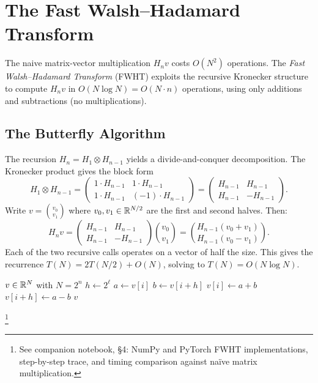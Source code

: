 \section{The Fast Walsh--Hadamard Transform}\label{sec:fwht}

The naive matrix-vector multiplication $H_n v$ costs $O(N^2)$ operations.
The \emph{Fast Walsh--Hadamard Transform} (FWHT)%
\citep{shanks1969computation} exploits the recursive Kronecker
structure to compute $H_n v$ in $O(N \log N) = O(N \cdot n)$
operations, using only additions and subtractions (no multiplications).

\subsection{The Butterfly Algorithm}\label{sec:butterfly}

The recursion $H_n = H_1 \otimes H_{n-1}$ yields a divide-and-conquer
decomposition. The Kronecker product gives the block form
\[
  H_1 \otimes H_{n-1}
  = \begin{pmatrix} 1 \cdot H_{n-1} & 1 \cdot H_{n-1} \\
                     1 \cdot H_{n-1} & (-1) \cdot H_{n-1} \end{pmatrix}
  = \begin{pmatrix} H_{n-1} & H_{n-1} \\ H_{n-1} & -H_{n-1} \end{pmatrix}.
\]
Write $v = \binom{v_0}{v_1}$ where $v_0, v_1 \in \mathbb{R}^{N/2}$
are the first and second halves. Then:
\[
  H_n v
  = \begin{pmatrix} H_{n-1} & H_{n-1} \\ H_{n-1} & -H_{n-1} \end{pmatrix}
    \binom{v_0}{v_1}
  = \binom{H_{n-1}(v_0 + v_1)}{H_{n-1}(v_0 - v_1)}.
\]
Each of the two recursive calls operates on a vector of half the size.
This gives the recurrence $T(N) = 2T(N/2) + O(N)$, solving to
$T(N) = O(N \log N)$.

\begin{algorithm}[H]
\caption{Fast Walsh--Hadamard Transform (in-place)}\label{alg:fwht}
\begin{algorithmic}[1]
\Require $v \in \mathbb{R}^N$ with $N = 2^n$
  \State $h \gets 2^\ell$ 
      \State $a \gets v[i]$
      \State $b \gets v[i + h]$
      \State $v[i] \gets a + b$
      \State $v[i + h] \gets a - b$
    \EndFor
  \EndFor
\EndFor
\State \Return $v$ 
\end{algorithmic}
\end{algorithm}%
\footnote{See companion notebook, \S4: NumPy and PyTorch FWHT
implementations, step-by-step trace, and timing comparison against
na\"ive matrix multiplication.}


